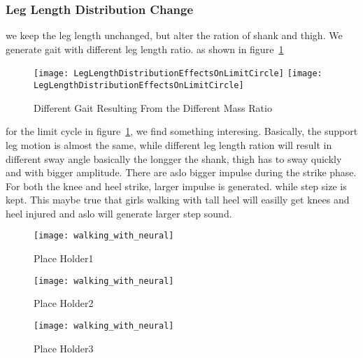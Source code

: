 


	


\subsubsection*{Leg Length Distribution Change}
we keep the leg length unchanged, but alter the ration of shank and thigh.
We generate gait with different leg length ratio.
as shown in figure~\ref{fig:differentlr}

\begin{figure}[!htbp]
  \begin{center}
    \leavevmode
    \ifpdf
      \texttt{[image: LegLengthDistributionEffectsOnLimitCircle]}
    \else
      \texttt{[image: LegLengthDistributionEffectsOnLimitCircle]}
    \fi
    \caption{Different Gait Resulting From the Different Mass Ratio}
    \label{fig:differentlr}
\end{center}
\end{figure}

for the limit cycle in figure~\ref{fig:differentlr}, we find something interesing.
Basically, the support leg motion is almost the same, while different leg length ration will result in different sway angle
basically the longger the shank, thigh has to sway quickly and with bigger amplitude.
There are aslo bigger impulse during the strike phase. For both the knee and heel strike, larger impulse is generated.
while step size is kept.
This maybe true that girls walking with tall heel will easilly get knees and heel injured and aslo will generate larger step sound.


\begin{figure}[!htbp]
  \begin{center}
      \texttt{[image: walking\_with\_neural]}
    \caption{Place Holder1}
    \label{fig:lr1}
\end{center}
\end{figure}

\begin{figure}[!htbp]
  \begin{center}
      \texttt{[image: walking\_with\_neural]}
    \caption{Place Holder2}
    \label{fig:lr2}
\end{center}
\end{figure}

\begin{figure}[!htbp]
  \begin{center}
      \texttt{[image: walking\_with\_neural]}
    \caption{Place Holder3}
    \label{fig:lr3}
\end{center}
\end{figure}




